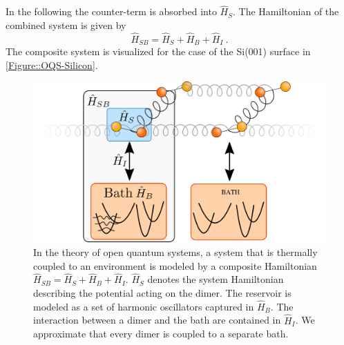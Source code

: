 	In the following the counter-term is absorbed into $\hat{H}_S$. The Hamiltonian of the combined system is given by
	\begin{equation}
		\hat{H}_{SB} = \hat{H}_S + \hat{H}_B + \hat{H}_I~.
	\end{equation}
	The composite system is visualized for the case of the Si(001) surface in \autoref{Figure::OQS-Silicon}.
	\begin{figure}[tp]
		\centering
		\includegraphics[width=0.8\linewidth]{graphics/OQS-Silicon.png}
		\caption{In the theory of open quantum systems, a system that is thermally coupled to an environment is modeled by a composite Hamiltonian $\hat{H}_{SB} =	\hat{H}_S + \hat{H}_B + \hat{H}_I$. $\hat{H}_S$ denotes the system Hamiltonian describing the potential acting on the dimer. The reservoir is modeled as a set of harmonic oscillators captured in $\hat{H}_B$. The interaction between a dimer and the bath are contained in $\hat{H}_I$. We approximate that every dimer is coupled to a separate bath.}
		\label{Figure::OQS-Silicon}
	\end{figure}
 \\
	
